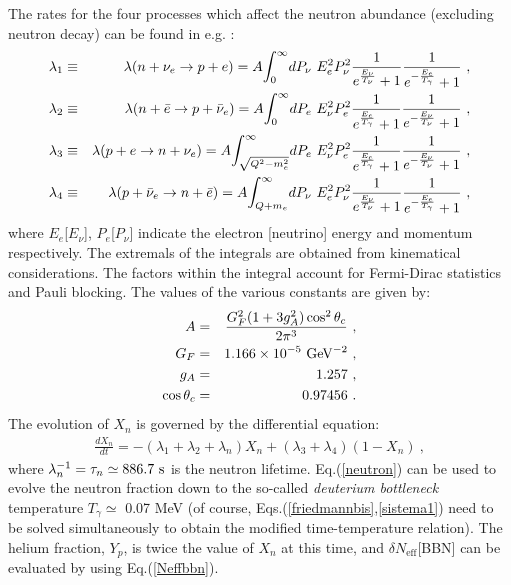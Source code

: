 \documentclass[12pt]{article}
\begin{document}
The rates for the four processes which affect the neutron abundance (excluding neutron decay) can be found in e.g. \cite{weinberg}:
%
\begin{eqnarray}
\lambda _1 & \equiv & \lambda (n + \nu _e \rightarrow p + e) = A \mathlarger \int ^{\infty}_{0} dP_{\nu} \ E_e^2 P_{\nu}^2 \frac{1}{e^{\frac{E_{\nu}}{T_{\nu}}}+1} \frac{1}{e^{-\frac{E_e}{T_{\gamma}}}+1} \ ,
\\
\lambda _2 & \equiv & \lambda (n + \bar e \rightarrow p + \bar \nu _e) = A \mathlarger \int ^{\infty}_{0} dP_e \ E_{\nu}^2 P_e^2 \frac{1}{e^{\frac{E_e}{T_{\gamma}}}+1} \frac{1}{e^{-\frac{E_{\nu}}{T_{\nu}}}+1} \ ,
\\
\lambda _3 & \equiv & \lambda (p + e \rightarrow n + \nu _e) = A \mathlarger \int ^{\infty}_{\sqrt{Q^2-m_e^2}} dP_e \ E_{\nu}^2 P_e^2 \frac{1}{e^{\frac{E_e}{T_{\gamma}}}+1} \frac{1}{e^{-\frac{E_{\nu}}{T_{\nu}}}+1} \ ,
\\
\lambda _4 & \equiv & \lambda (p + \bar \nu _e \rightarrow n + \bar e) = A \mathlarger \int ^{\infty}_{Q+m_e} dP_{\nu} \ E_e^2 P_{\nu}^2 \frac{1}{e^{\frac{E_{\nu}}{T_{\nu}}}+1} \frac{1}{e^{-\frac{E_e}{T_{\gamma}}}+1} \ ,
\end{eqnarray}
%
where $E _e$[$E _{\nu}$], $P _e$[$P _{\nu}$] indicate the electron [neutrino] energy and momentum respectively. The extremals of the integrals are obtained from kinematical considerations. The factors within the integral account for Fermi-Dirac statistics and Pauli blocking. The values of the various constants are given by:
%
\begin{eqnarray}
A & = & \frac{G_F^2 (1+3g_A^2)\cos ^2\theta _c}{2\pi ^3} \ , \nonumber \\
G_F & = & 1.166 \times 10^{-5} \ {\rm GeV^{-2}} \ , \nonumber \\
g_A & = & 1.257 \ , \nonumber \\
\cos \theta _c & = & 0.97456 \ .
\end{eqnarray}
%
The evolution of $X _n$ is governed by the differential equation:
%
\begin{eqnarray}
\frac{dX _n}{dt} = -( \lambda _1 + \lambda _2 + \lambda _n)X _n + (\lambda _3 + \lambda _4)(1 - X _n) \ ,
\label{neutron}
\end{eqnarray}
%
where $\lambda _n ^{-1} = \tau _n \simeq 886.7 \ \rm s$ is the neutron lifetime. Eq.(\ref{neutron}) can be used to evolve the neutron fraction down to the so-called \textit{deuterium bottleneck} temperature $T _{\gamma} \simeq$ 0.07 MeV (of course, Eqs.(\ref{friedmannbis},\ref{sistema1}) need to be solved simultaneously to obtain the modified time-temperature relation). The helium fraction, $Y _p$, is twice the value of $X _n$ at this time, and $\delta N _{\text{eff}}$[BBN] can be evaluated by using Eq.(\ref{Neffbbn}).
\end{document}
